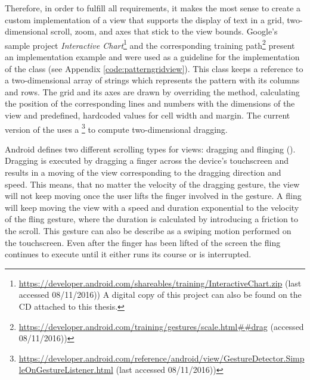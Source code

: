 Therefore, in order to fulfill all requirements, it makes the most sense to create a custom implementation of a view that supports the display of text in a grid, two-dimensional scroll, zoom, and axes that stick to the view bounds. Google's sample project \textit{Interactive Chart}\footnote{\url{https://developer.android.com/shareables/training/InteractiveChart.zip} (last accessed 08/11/2016)) A digital copy of this project can also be found on the CD attached to this thesis.} and the corresponding training path\footnote{\url{https://developer.android.com/training/gestures/scale.html##drag} (accessed 08/11/2016))} present an implementation example and were used as a guideline for the implementation of the class  (see Appendix \ref{code:patterngridview}). This class keeps a reference to a two-dimensional array of strings which represents the pattern with its columns and rows. The grid and its axes are drawn by overriding the  method, calculating the position of the corresponding lines and numbers with the dimensions of the view and predefined, hardcoded values for cell width and margin. The current version of the  uses a \footnote{\url{https://developer.android.com/reference/android/view/GestureDetector.SimpleOnGestureListener.html} (last accessed 08/11/2016))} to compute two-dimensional dragging. 

Android defines two different scrolling types for views: dragging and flinging (\cite{android_scrolling_types}). Dragging is executed by dragging a finger across the device's touchscreen and results in a moving of the view corresponding to the dragging direction and speed. This means, that no matter the velocity of the dragging gesture, the view will not keep moving once the user lifts the finger involved in the gesture. A fling will keep moving the view with a speed and duration exponential to the velocity of the fling gesture, where the duration is calculated by introducing a friction to the scroll. This gesture can also be describe as a swiping motion performed on the touchscreen. Even after the finger has been lifted of the screen the fling continues to execute until it either runs its course or is interrupted.

